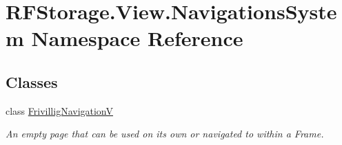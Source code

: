 \hypertarget{namespace_r_f_storage_1_1_view_1_1_navigations_system}{}\section{R\+F\+Storage.\+View.\+Navigations\+System Namespace Reference}
\label{namespace_r_f_storage_1_1_view_1_1_navigations_system}
\subsection*{Classes}
\begin{DoxyCompactItemize}
\item 
class \mbox{\hyperlink{class_r_f_storage_1_1_view_1_1_navigations_system_1_1_frivillig_navigation_v}{Frivillig\+NavigationV}}
\begin{DoxyCompactList}\small\item\em An empty page that can be used on its own or navigated to within a Frame. \end{DoxyCompactList}\end{DoxyCompactItemize}
